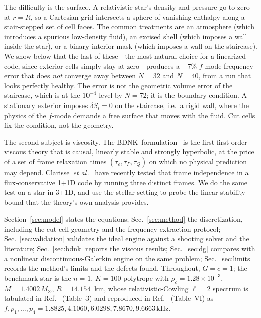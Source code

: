 \documentclass[aps,prd,reprint,amsmath,amssymb,nofootinbib,longbibliography,superscriptaddress]{revtex4-2}
\newcommand{\Msun}{M_\odot}
\newcommand{\kHz}{\,\mathrm{kHz}}
\newcommand{\BDNK}{BDNK}
\newcommand{\dS}{\delta S}
\begin{document}
The difficulty is the surface. A relativistic star's density and pressure go to zero at $r=R$,
so a Cartesian grid intersects a sphere of vanishing enthalpy along a stair-stepped set of cell
faces. The common treatments are an atmosphere (which introduces a spurious low-density fluid),
an excised shell (which imposes a wall inside the star), or a binary interior mask (which
imposes a wall on the staircase). We show below that the last of these---the most natural
choice for a linearized code, since exterior cells simply stay at zero---produces a $-7\%$
$f$-mode frequency error that does \emph{not} converge away between $N=32$ and $N=40$, from a
run that looks perfectly healthy. The error is not the geometric volume error of the staircase,
which is at the $10^{-4}$ level by $N=72$; it is the boundary condition. A stationary exterior
imposes $\dS_i = 0$ on the staircase, i.e.\ a rigid wall, where the physics of the $f$-mode
demands a free surface that moves with the fluid. Cut cells fix the condition, not the geometry.

The second subject is viscosity. The \BDNK\ formulation~\cite{BDN2022,Kovtun2019} is the first
first-order viscous theory that is causal, linearly stable and strongly hyperbolic, at the price
of a set of frame relaxation times $(\tau_\varepsilon,\tau_P,\tau_Q)$ on which no physical
prediction may depend. Clarisse~\emph{et al.}~\cite{Clarisse2025} have recently tested that
frame independence in a flux-conservative 1+1D code by running three distinct frames. We do the
same test on a star in 3+1D, and use the stellar setting to probe the linear stability bound
that the theory's own analysis provides.

Section~\ref{sec:model} states the equations; Sec.~\ref{sec:method} the discretization,
including the cut-cell geometry and the frequency-extraction protocol;
Sec.~\ref{sec:validation} validates the ideal engine against a shooting solver and the
literature; Sec.~\ref{sec:bdnk} reports the viscous results; Sec.~\ref{sec:dg} compares with a
nonlinear discontinuous-Galerkin engine on the same problem; Sec.~\ref{sec:limits} records the
method's limits and the defects found. Throughout, $G=c=1$; the benchmark star is the $n=1$,
$K=100$ polytrope with $\rho_c = 1.28\times10^{-3}$, $M = 1.4002\,\Msun$, $R = 14.154$~km, whose
relativistic-Cowling $\ell=2$ spectrum is tabulated in Ref.~\cite{Font2000} (Table~3) and
reproduced in Ref.~\cite{Nouri2022} (Table~VI) as $f, p_1, \ldots, p_4 = 1.8825, 4.1060,
6.0298, 7.8670, 9.6663\kHz$.

\end{document}
